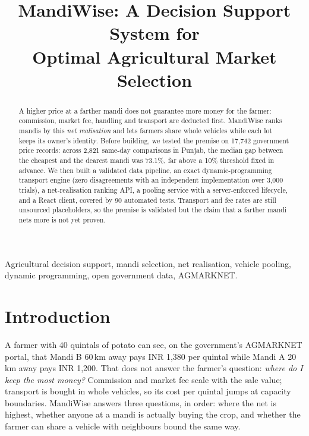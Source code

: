 \documentclass[conference]{IEEEtran}
\newcommand{\TestsAll}{90}
\begin{document}
\title{MandiWise: A Decision Support System for\\
Optimal Agricultural Market Selection}

\author{
}
\maketitle

\begin{abstract}
A higher price at a farther mandi does not guarantee more money for the
farmer: commission, market fee, handling and transport are deducted first.
MandiWise ranks mandis by this \emph{net realisation} and lets farmers
share whole vehicles while each lot keeps its owner's identity. Before
building, we tested the premise on 17,742 government price records: across
2,821 same-day comparisons in Punjab, the median gap between the cheapest
and the dearest mandi was 73.1\%, far above a 10\% threshold fixed in
advance. We then built a validated data pipeline, an exact
dynamic-programming transport engine (zero disagreements with an
independent implementation over 3,000 trials), a net-realisation ranking
API, a pooling service with a server-enforced lifecycle, and a React
client, covered by \TestsAll{} automated tests. Transport and fee rates are
still unsourced placeholders, so the premise is validated but the claim
that a farther mandi nets more is not yet proven.
\end{abstract}

\begin{IEEEkeywords}
Agricultural decision support, mandi selection, net realisation, vehicle
pooling, dynamic programming, open government data, AGMARKNET.
\end{IEEEkeywords}

\section{Introduction}
\label{sec:intro}
A farmer with 40 quintals of potato can see, on the government's
AGMARKNET portal, that Mandi B 60\,km away pays INR 1,380 per quintal
while Mandi A 20\,km away pays INR 1,200. That does not answer the
farmer's question: \emph{where do I keep the most money?} Commission and
market fee scale with the sale value; transport is bought in whole
vehicles, so its cost per quintal jumps at capacity boundaries. MandiWise
answers three questions, in order: where the net is highest, whether
anyone at a mandi is actually buying the crop, and whether the farmer can
share a vehicle with neighbours bound the same way.
\end{document}
